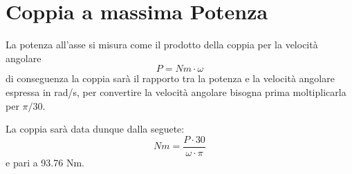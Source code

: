 \documentclass[a4paper,12pt]{article}
\begin{document}
\section{Coppia a massima Potenza}
\label{sec:coppia_a_massima_potenza}
La potenza all'asse si misura come il prodotto della coppia per la velocità angolare
\begin{equation}
    P = Nm \cdot \omega
\end{equation}
di conseguenza la coppia sarà il rapporto tra la potenza e la velocità angolare espressa in rad/s, per convertire la velocità angolare bisogna prima moltiplicarla
per $\pi/30$.

La coppia sarà data dunque dalla seguete:
\begin{equation}
    Nm = \frac{P\cdot 30 }{\omega\cdot \pi}
\end{equation}
e pari a 93.76 Nm.
\end{document}
